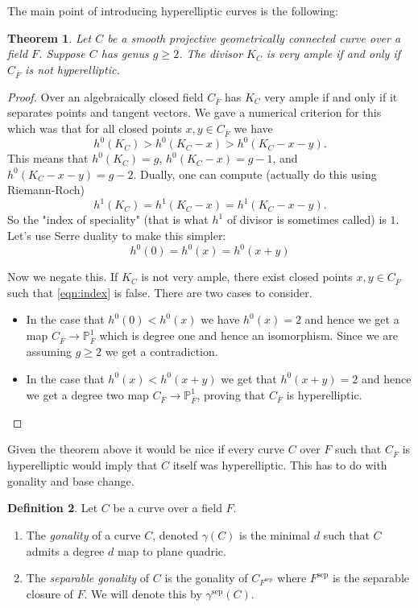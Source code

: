 \documentclass[12pt]{article}
\numberwithin{equation}{section}
\newtheorem{theorem}{Theorem}[subsection]
\theoremstyle{definition}
\newtheorem{definition}[theorem]{Definition}
\theoremstyle{remark}
\newcommand{\PP}{\mathbb{P}}
\newcommand{\Fbar}{\overline{F}}
\newcommand{\sep}{\operatorname{sep}}
\begin{document}
The main point of introducing hyperelliptic curves is the following:
\begin{theorem}
	Let $C$ be a smooth projective geometrically connected curve over a field $F$. 
	Suppose $C$ has genus $g\geq 2$. The divisor $K_C$ is very ample if and only if $C_{\Fbar}$ is not hyperelliptic. 
\end{theorem}
\begin{proof}
	Over an algebraically closed field $C_{\Fbar}$ has $K_C$ very ample if and only if it separates points and tangent vectors. 
	We gave a numerical criterion for this which was that for all closed points $x,y\in C_{\Fbar}$ we have 
	$$ h^0(K_C)> h^0(K_C-x) > h^0(K_C-x-y). $$
	This means that $h^0(K_C)=g$, $h^0(K_C-x)=g-1$, and $h^0(K_C-x-y)=g-2$. 
	Dually, one can compute (actually do this using Riemann-Roch)
	$$h^1(K_C)=h^1(K_C-x)=h^1(K_C-x-y).$$
	So the "index of speciality" (that is what $h^1$ of divisor is sometimes called) is $1$. 
	Let's use Serre duality to make this simpler:
	\begin{equation}\label{eqn:index}
	h^0(0) = h^0(x) = h^0(x+y)
	\end{equation}
	
	Now we negate this. 
	If $K_C$ is not very ample, there exist closed points $x,y\in C_{\Fbar}$ such that \eqref{eqn:index} is false.
	There are two cases to consider. 
	\begin{itemize}
		\item In the case that $h^0(0)<h^0(x)$ we have $h^0(x)=2$ and hence we get a map $C_{\Fbar}\to \PP^1_{\Fbar}$ which is degree one and hence an isomorphism.
		Since we are assuming $g\geq 2$ we get a contradiction.
		\item In the case that $h^0(x)<h^0(x+y)$ we get that $h^0(x+y)=2$ and hence we get a degree two map $C_{\Fbar} \to \PP^1_{\Fbar}$, proving that $C_{\Fbar}$ is hyperelliptic. 
	\end{itemize}
	
	
\end{proof}

Given the theorem above it would be nice if every curve $C$ over $F$ such that $C_{\overline{F}}$ is hyperelliptic would imply that $C$ itself was hyperelliptic. 
This has to do with gonality and base change. 
\begin{definition}
	Let $C$ be a curve over a field $F$. 
	\begin{enumerate}
		\item 	The \emph{gonality} of a curve $C$, denoted $\gamma(C)$ is the minimal $d$ such that $C$ admits a degree $d$ map to plane quadric.
		\item The \emph{separable gonality} of $C$ is the gonality of $C_{F^{\sep}}$ where $F^{\sep}$ is the separable closure of $F$. 
		We will denote this by $\gamma^{\sep}(C)$. 
	\end{enumerate}
\end{definition}
\end{document}
